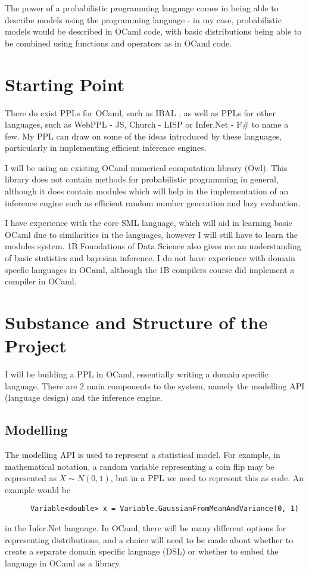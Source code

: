 The power of a probabilistic programming language comes in being able to describe models using the programming language - in my case, probabilistic models would be described in OCaml code, with basic distributions being able to be combined using functions and operators as in OCaml code.

\section*{Starting Point}

There do exist PPLs for OCaml, such as IBAL \cite{ibal}, as well as PPLs for other languages, such as WebPPL - JS\cite{mobus2018structure}, Church - LISP\cite{goodman2012church} or Infer.Net - F\#\cite{wang2011using} to name a few. My PPL can draw on some of the ideas introduced by these languages, particularly in implementing efficient inference engines.

I will be using an existing OCaml numerical computation library (Owl). This library does not contain methods for probabilistic programming in general, although it does contain modules which will help in the implementation of an inference engine such as efficient random number generation and lazy evaluation.

I have experience with the core SML language, which will aid in learning basic OCaml due to similarities in the languages, however I will still have to learn the modules system. 1B Foundations of Data Science also gives me an understanding of basic statistics and bayesian inference. I do not have experience with domain specfic languages in OCaml, although the 1B compilers course did implement a compiler in OCaml.

\section*{Substance and Structure of the Project}

I will be building a PPL in OCaml, essentially writing a domain specific language. There are 2 main components to the system, namely the modelling API (language design) and the inference engine.

\subsection*{Modelling}
The modelling API is used to represent a statistical model. For example, in mathematical notation, a random variable representing a coin flip may be represented as $X \sim N(0,1)$, but in a PPL we need to represent this as code. An example would be
\begin{verbatim}
      Variable<double> x = Variable.GaussianFromMeanAndVariance(0, 1)
\end{verbatim}
in the Infer.Net language. In OCaml, there will be many different options for representing distributions, and a choice will need to be made about whether to create a separate domain specific language (DSL) or whether to embed the language in OCaml as a library. 

